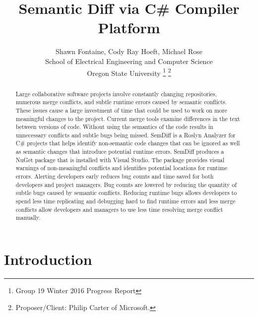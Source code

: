 \documentclass[draftclsnofoot,onecolumn]{IEEEtran}
\begin{document}
\lstset{style=cSharp}
\title{Semantic Diff via C\# Compiler Platform}

\author{Shawn Fontaine, Cody Ray Hoeft, Michael Rose\\
	School of Electrical Engineering and Computer Science\\
	Oregon State University
\thanks{Group 19 Winter 2016 Progress Report}
\thanks{Proposer/Client: Philip Carter of Microsoft.}}

\maketitle
{} %

\begin{abstract}
Large collaborative software projects involve constantly changing repositories, 
numerous merge conflicts, and subtle runtime errors caused by semantic 
conflicts. These issues cause a large investment of time that could be used to 
work on more meaningful changes to the project. Current merge tools examine 
differences in the text between versions of code. Without using the semantics of 
the code results in unnecessary conflicts and subtle bugs being missed. SemDiff 
is a Roslyn Analyzer for C\# projects that helps identify non-semantic code 
changes that can be ignored as well as semantic changes that introduce potential 
runtime errors. SemDiff produces a NuGet package that is installed with Visual 
Studio. The package provides visual warnings of non-meaningful conflicts and 
identifies potential locations for runtime errors. Alerting developers early 
reduces bug counts and time saved for both developers and project managers. Bug 
counts are lowered by reducing the quantity of subtle bugs caused by semantic 
conflicts. Reducing runtime bugs allows developers to spend less time 
replicating and debugging hard to find runtime errors and less merge conflicts 
allow developers and managers to use less time resolving merge conflict 
manually. 
\end{abstract}

\newpage
\setcounter{tocdepth}{2}
\tableofcontents


\newpage
{}

\section{Introduction}%
\end{document}
